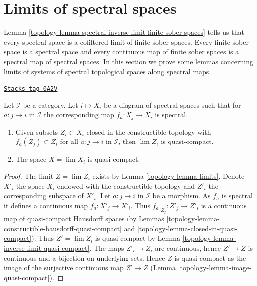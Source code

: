 \section{Limits of spectral spaces}
\label{topology-section-limits-spectral}
Lemma \ref{topology-lemma-spectral-inverse-limit-finite-sober-spaces} tells us
that every spectral space is a cofiltered limit of finite sober
spaces. Every finite sober space is a spectral space and every continuous
map of finite sober spaces is a spectral map of spectral spaces.
In this section we prove some lemmas concerning limits of systems
of spectral topological spaces along spectral maps.

\begin{lemma}
\label{topology-lemma-inverse-limit-spectral-spaces-quasi-compact}
\href{https://stacks.math.columbia.edu/tag/0A2V}{\texttt{Stacks tag 0A2V}}

Let $\mathcal{I}$ be a category. Let $i \mapsto X_i$ be a diagram
of spectral spaces such that for $a : j \to i$ in $\mathcal{I}$
the corresponding map $f_a : X_j \to X_i$ is spectral.
\begin{enumerate}
\item Given subsets $Z_i \subset X_i$ closed in the constructible
topology with $f_a(Z_j) \subset Z_i$ for all $a : j \to i$ in $\mathcal{I}$,
then $\lim Z_i$ is quasi-compact.
\item The space $X = \lim X_i$ is quasi-compact.
\end{enumerate}
\end{lemma}

\begin{proof}

The limit $Z = \lim Z_i$ exists by Lemma \ref{topology-lemma-limits}.
Denote $X'_i$ the space $X_i$ endowed with the constructible topology
and $Z'_i$ the corresponding subspace of $X'_i$.
Let $a : j \to i$ in $\mathcal{I}$ be a morphism. As $f_a$ is spectral
it defines a continuous map $f_a : X'_j \to X'_i$. Thus
$f_a|_{Z_j} : Z'_j \to Z'_i$ is a continuous map of quasi-compact
Hausdorff spaces (by
Lemmas \ref{topology-lemma-constructible-hausdorff-quasi-compact} and
\ref{topology-lemma-closed-in-quasi-compact}).
Thus $Z' = \lim Z_i$ is quasi-compact by
Lemma \ref{topology-lemma-inverse-limit-quasi-compact}.
The maps $Z'_i \to Z_i$ are continuous, hence $Z' \to Z$
is continuous and a bijection on underlying sets. Hence $Z$
is quasi-compact as the image of the surjective continuous map $Z' \to Z$
(Lemma \ref{topology-lemma-image-quasi-compact}).
\end{proof}

